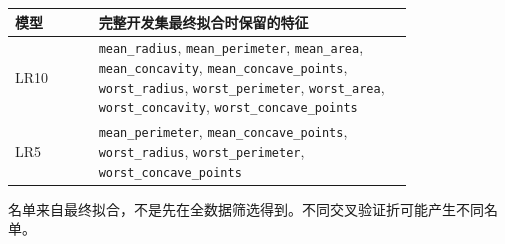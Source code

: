 \begin{center}
\small
\setlength{\tabcolsep}{5pt}
\renewcommand{\arraystretch}{1.25}
\begin{tabular}{l>{\raggedright\arraybackslash}p{0.79\linewidth}}
\toprule
模型 & 完整开发集最终拟合时保留的特征 \tabularnewline
\midrule
LR10 & \texttt{mean\_radius}, \texttt{mean\_perimeter}, \texttt{mean\_area}, \texttt{mean\_concavity}, \texttt{mean\_concave\_points}, \texttt{worst\_radius}, \texttt{worst\_perimeter}, \texttt{worst\_area}, \texttt{worst\_concavity}, \texttt{worst\_concave\_points} \tabularnewline
LR5 & \texttt{mean\_perimeter}, \texttt{mean\_concave\_points}, \texttt{worst\_radius}, \texttt{worst\_perimeter}, \texttt{worst\_concave\_points} \tabularnewline
\bottomrule
\end{tabular}
\end{center}
{\footnotesize 名单来自最终拟合，不是先在全数据筛选得到。不同交叉验证折可能产生不同名单。}
